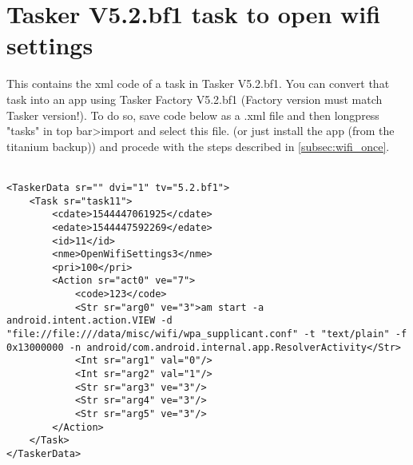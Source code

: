 \section{Tasker V5.2.bf1 task to open wifi settings}\label{app:E}
This contains the xml code of a task in Tasker V5.2.bf1. You can convert that task into an app using Tasker Factory V5.2.bf1 (Factory version must match Tasker version!). To do so, save code below as a .xml file and then longpress "tasks" in top bar>import and select this file. (or just install the app (from the titanium backup)) and procede with the steps described in \cref{subsec:wifi_once}.
\\
\\
\begin{verbatim}
<TaskerData sr="" dvi="1" tv="5.2.bf1">
    <Task sr="task11">
        <cdate>1544447061925</cdate>
        <edate>1544447592269</edate>
        <id>11</id>
        <nme>OpenWifiSettings3</nme>
        <pri>100</pri>
        <Action sr="act0" ve="7">
            <code>123</code>
            <Str sr="arg0" ve="3">am start -a android.intent.action.VIEW -d "file://file:///data/misc/wifi/wpa_supplicant.conf" -t "text/plain" -f 0x13000000 -n android/com.android.internal.app.ResolverActivity</Str>
            <Int sr="arg1" val="0"/>
            <Int sr="arg2" val="1"/>
            <Str sr="arg3" ve="3"/>
            <Str sr="arg4" ve="3"/>
            <Str sr="arg5" ve="3"/>
        </Action>
    </Task>
</TaskerData>
\end{verbatim}